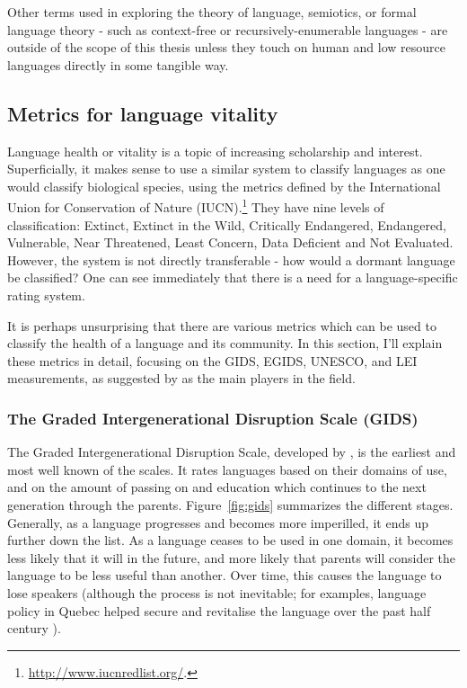 Other terms used in exploring the theory of language, semiotics, or formal language theory - such as context-free or recursively-enumerable languages - are outside of the scope of this thesis unless they touch on human and low resource languages directly in some tangible way.

\subsection{Metrics for language vitality}
\label{subsec:metrics}

Language health or vitality is a topic of increasing scholarship and interest. Superficially, it makes sense to use a similar system to classify languages as one would classify biological species, using the metrics defined by the International Union for Conservation of Nature (IUCN).\footnote{\href{http://www.iucnredlist.org/}{http://www.iucnredlist.org/}. } They have nine levels of classification: Extinct, Extinct in the Wild, Critically Endangered, Endangered, Vulnerable, Near Threatened, Least Concern, Data Deficient and Not Evaluated. However, the system is not directly transferable - how would a dormant language be classified? One can see immediately that there is a need for a language-specific rating system.

It is perhaps unsurprising that there are various metrics which can be used to classify the health of a language and its community. In this section, I'll explain these metrics in detail, focusing on the GIDS, EGIDS, UNESCO, and LEI measurements, as suggested by \citet{yang2017toward} as the main players in the field.

\subsubsection{The Graded Intergenerational Disruption Scale (GIDS)}

The Graded Intergenerational Disruption Scale, developed by \citet{fishman1991reversing}, is the earliest and most well known of the scales. It rates languages based on their domains of use, and on the amount of passing on and education which continues to the next generation through the parents. Figure~\ref{fig:gids} summarizes the different stages. Generally, as a language progresses and becomes more imperilled, it ends up further down the list. As a language ceases to be used in one domain, it becomes less likely that it will in the future, and more likely that parents will consider the language to be less useful than another. Over time, this causes the language to lose speakers (although the process is not inevitable; for examples, language policy in Quebec helped secure and revitalise the language over the past half century \citep{bourhis2001reversing}).

